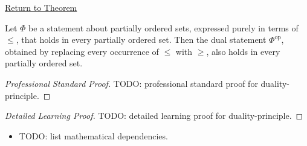 \newpage
{}
\label{prf:duality-principle}

\begin{remark*}[Return]
\hyperref[prop:duality-principle]{Return to Theorem}
\end{remark*}

\begin{proposition*}
Let $\Phi$ be a statement about partially ordered sets, expressed purely
in terms of $\leq$, that holds in every partially ordered set.  Then the
dual statement $\Phi^{\mathrm{op}}$, obtained by replacing every
occurrence of $\leq$ with $\geq$, also holds in every partially ordered
set.
\end{proposition*}

\begin{proof}[Professional Standard Proof]
\LRAProofBodyStart
TODO: professional standard proof for duality-principle.
\end{proof}

\begin{proof}[Detailed Learning Proof]
\LRAProofBodyStart
TODO: detailed learning proof for duality-principle.
\end{proof}

\begin{remark*}
\end{remark*}

\begin{dependencies}
\begin{itemize}
  \item TODO: list mathematical dependencies.
\end{itemize}
\end{dependencies}

\clearpage
